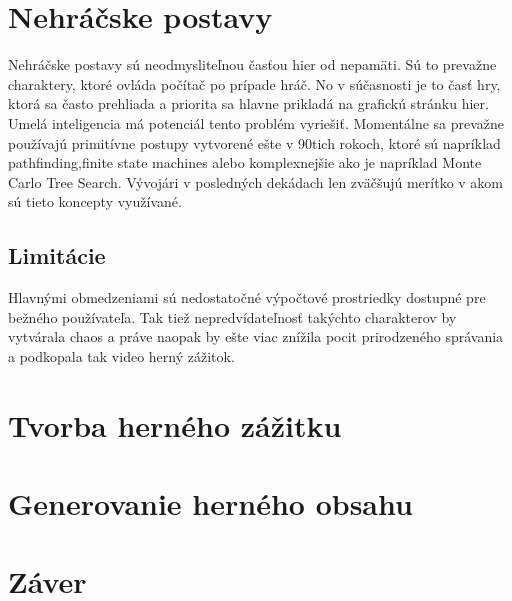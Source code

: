 \documentclass{article}
\begin{document}
\section{Nehráčske postavy}

Nehráčske postavy sú neodmysliteľnou časťou hier od nepamäti. Sú to prevažne charaktery, ktoré ovláda počítač po prípade hráč. No v súčasnosti je to časť hry, ktorá sa často prehliada a priorita sa hlavne prikladá na grafickú stránku hier. Umelá inteligencia má potenciál tento problém vyriešiť. Momentálne sa prevažne používajú primitívne postupy vytvorené ešte v 90tich rokoch, ktoré sú napríklad pathfinding,finite state machines alebo komplexnejšie ako je napríklad Monte Carlo Tree Search\cite{nickstatt}. Vývojári v posledných dekádach len zväčšujú merítko v akom sú tieto koncepty využívané.

\subsection{Limitácie}

Hlavnými obmedzeniami sú nedostatočné výpočtové prostriedky dostupné pre bežného používateľa. Tak tiež nepredvídateľnosť takýchto charakterov by vytvárala chaos a práve naopak by ešte viac znížila pocit prirodzeného správania a podkopala tak video herný zážitok\cite{phdthesis}.

\section{Tvorba herného zážitku}

\section{Generovanie herného obsahu}
\section{Záver}



\end{document}
